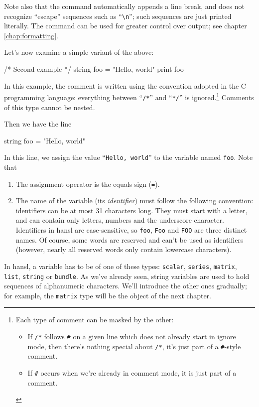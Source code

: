 Note also that the  command automatically appends a line
break, and does not recognize ``escape'' sequences such as
``\verb|\n|''; such sequences are just printed literally. The
 command can be used for greater control over output; see
chapter \ref{chap:formatting}.

Let's now examine a simple variant of the above:
\begin{code}
  /*
    Second example
  */
  string foo = "Hello, world"
  print foo
\end{code}

In this example, the comment is written using the convention adopted
in the C programming language: everything between ``\verb|/*|'' and
``\verb|*/|'' is ignored.\footnote{Each type of comment can be masked
  by the other:
\begin{itemize}
\item If \texttt{/*} follows \texttt{\#} on a given line which does
  not already start in ignore mode, then there's nothing special about
  \texttt{/*}, it's just part of a \texttt{\#}-style comment.
\item If \texttt{\#} occurs when we're already in comment mode, it is
  just part of a comment.
\end{itemize}} Comments of this type cannot be nested.

Then we have the line
\begin{code}
  string foo = "Hello, world"
\end{code}
In this line, we assign the value ``\texttt{Hello, world}'' to the
variable named \texttt{foo}. Note that
\begin{enumerate}
\item The assignment operator is the equals sign (\texttt{=}).
\item The name of the variable (its \emph{identifier}) must follow
  the following convention: identifiers can be at most 31 characters
  long. They must start with a letter, and can contain only letters,
  numbers and the underscore character. Identifiers in hansl are
  case-sensitive, so \texttt{foo}, \texttt{Foo} and \texttt{FOO} are
  three distinct names. Of course, some words are reserved and can't
  be used as identifiers (however, nearly all reserved words only
  contain lowercase characters).
\end{enumerate}

In hansl, a variable has to be of one of these types: \texttt{scalar},
\texttt{series}, \texttt{matrix}, \texttt{list}, \texttt{string} or
\texttt{bundle}. As we've already seen, string variables are used to
hold sequences of alphanumeric characters. We'll introduce the other
ones gradually; for example, the \texttt{matrix} type will be the
object of the next chapter.  

